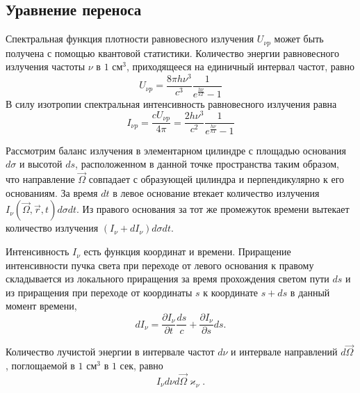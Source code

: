 \subsection{Уравнение переноса}
Спектральная функция плотности равновесного излучения $U_{\nu p}$ может быть получена с помощью квантовой статистики. Количество энергии равновесного излучения частоты $\nu$ в $1 \text{ см}^3$, приходящееся на единичный интервал частот, равно
\begin {equation}
U_{\nu p} = \frac{8 \pi h \nu^3}{c^3} \frac {1}{e^{\frac{h\nu}{kT}} - 1}
\end {equation}
В силу изотропии спектральная интенсивность равновесного излучения равна
\begin {equation}
I_{\nu p} = \frac{cU_{\nu p}}{4\pi} = \frac{2h\nu^3}{c^2}\frac{1}{e^{\frac{h\nu}{kT}} - 1}
\label{5}
\end {equation}

Рассмотрим баланс излучения в элементарном цилиндре с площадью основания $d\sigma$ и высотой $ds$, расположенном в данной точке пространства таким образом, что направление $\vec\Omega$ совпадает с образующей цилиндра и перпендикулярно к его основаниям. За время $dt$ в левое основание втекает количество излучения $I_{\nu} (\vec\Omega, \vec r,t)d\sigma dt$. Из правого основания за тот же промежуток времени вытекает количество излучения $(I_{\nu} + dI_{\nu})d \sigma dt$.

Интенсивность $I_{\nu}$ есть функция координат и времени. Приращение интенсивности пучка света при переходе от левого основания к правому складывается из локального приращения за время прохождения светом пути $ds$ и из приращения при переходе от координаты $s$ к координате $s+ds$ в данный момент времени, 
\begin {equation}
dI_{\nu}  = \frac{\partial I_{\nu}}{\partial t } \frac{ds}{c}+\frac{\partial I_{\nu}}{\partial s}ds.
\end {equation}

Количество лучистой энергии в интервале частот $d\nu$ и интервале направлений $d\vec\Omega$, поглощаемой в $1 \text{ см}^3$ в  $1 \text{ сек}$, равно
\begin {equation}
I_{\nu}d\nu d\vec\Omega \varkappa_{\nu}.
\label {3}
\end {equation}

